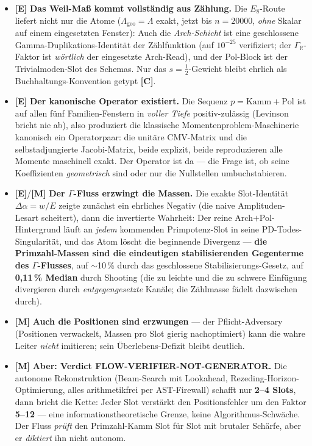 \documentclass[11pt,a4paper]{article}
\newcommand{\E}{\textcolor{gut}{\textbf{[E]}}}
\newcommand{\C}{\textcolor{kern}{\textbf{[C]}}}
\newcommand{\M}{\textcolor{mess}{\textbf{[M]}}}
\begin{document}
\begin{itemize}
\item \E{} \textbf{Das Weil-Maß kommt vollständig aus Zählung.} Die
      $E_8$-Route liefert nicht nur die Atome ($\Lambda_{\mathrm{geo}}
      = \Lambda$ exakt, jetzt bis $n = 20000$, \emph{ohne} Skalar
      auf einem eingesetzten Fenster): Auch die \emph{Arch-Schicht}
      ist eine geschlossene Gamma-Duplikations-Identität der
      Zählfunktion (auf $10^{-25}$ verifiziert; der
      $\Gamma_{\mathbb{R}}$-Faktor ist \emph{wörtlich} der
      eingesetzte Arch-Read), und der Pol-Block ist der
      Trivialmoden-Slot des Schemas. Nur das $s = \tfrac12$-Gewicht
      bleibt ehrlich als Buchhaltungs-Konvention getypt \C{}.
\item \E{} \textbf{Der kanonische Operator existiert.} Die Sequenz
      $p = \mathrm{Kamm} + \mathrm{Pol}$ ist auf allen fünf
      Familien-Fenstern in \emph{voller Tiefe} positiv-zulässig
      (Levinson bricht nie ab), also produziert die klassische
      Momentenproblem-Maschinerie kanonisch ein Operatorpaar: die
      unitäre CMV-Matrix und die selbstadjungierte Jacobi-Matrix,
      beide explizit, beide reproduzieren alle Momente maschinell
      exakt. Der Operator ist da --- die Frage ist, ob seine
      Koeffizienten \emph{geometrisch} sind oder nur die
      Nullstellen umbuchstabieren.
\item \E{}/\M{} \textbf{Der $\Gamma$-Fluss erzwingt die Massen.}
      Die exakte Slot-Identität $\Delta\alpha = w/E$ zeigte
      zunächst ein ehrliches Negativ (die naive Amplituden-Lesart
      scheitert), dann die invertierte Wahrheit: Der reine
      Arch$+$Pol-Hintergrund läuft an \emph{jedem} kommenden
      Primpotenz-Slot in seine PD-Todes-Singularität, und das Atom
      löscht die beginnende Divergenz --- \textbf{die Primzahl-Massen
      sind die eindeutigen stabilisierenden Gegenterme des
      $\Gamma$-Flusses}, auf $\sim$10\,\% durch das geschlossene
      Stabilisierungs-Gesetz, auf \textbf{0{,}11\,\% Median} durch
      Shooting (die zu leichte und die zu schwere Einfügung
      divergieren durch \emph{entgegengesetzte} Kanäle; die
      Zählmasse fädelt dazwischen durch).
\item \M{} \textbf{Auch die Positionen sind erzwungen} --- der
      Pflicht-Adversary (Positionen verwackelt, Massen pro Slot
      gierig nachoptimiert) kann die wahre Leiter \emph{nicht}
      imitieren; sein Überlebens-Defizit bleibt deutlich.
\item \M{} \textbf{Aber: Verdict FLOW-VERIFIER-NOT-GENERATOR.} Die
      autonome Rekonstruktion (Beam-Search mit Lookahead,
      Rezeding-Horizon-Optimierung, alles arithmetikfrei per
      AST-Firewall) schafft nur \textbf{2--4 Slots}, dann bricht die
      Kette: Jeder Slot verstärkt den Positionsfehler um den Faktor
      \textbf{5--12} --- eine informationstheoretische Grenze, keine
      Algorithmus-Schwäche. Der Fluss \emph{prüft} den Primzahl-Kamm
      Slot für Slot mit brutaler Schärfe, aber er \emph{diktiert}
      ihn nicht autonom.
\end{itemize}
\end{document}
